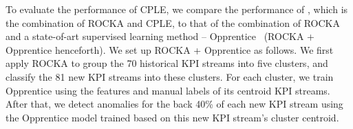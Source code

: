 To evaluate the performance of CPLE, we compare the performance of \name{}, which is the combination of ROCKA and CPLE, to that of the combination of ROCKA and a state-of-art supervised learning method -- Opprentice~\cite{liu2015opprentice} (ROCKA + Opprentice henceforth). 
We set up ROCKA + Opprentice as follows.
We first apply ROCKA to group the 70 historical KPI streams into five clusters, and classify the 81 new KPI streams into these clusters.
For each cluster, we train Opprentice using the features and manual labels of its centroid KPI streams.
After that, we detect anomalies for the back 40\% of each new KPI stream using the Opprentice model trained based on this new KPI stream's cluster centroid.





